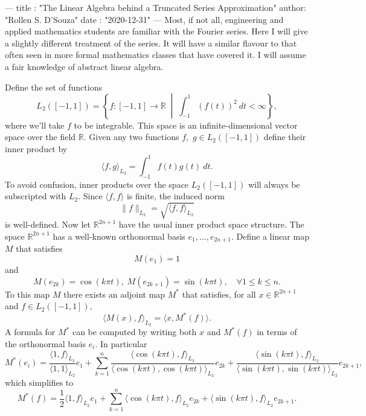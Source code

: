 ---
title :   "The Linear Algebra behind a Truncated Series Approximation"
author:   "Rollen S. D'Souza"
date  :   "2020-12-31"
---
Most, if not all, engineering and applied mathematics students are familiar with the Fourier series.
Here I will give a slightly different treatment of the series.
It will have a similar flavour to that often seen in more formal mathematics classes that have covered it.
I will assume a fair knowledge of abstract linear algebra.

Define the set of functions
\[
  L_2([-1, 1])
    =
      \left\{
        f: [-1, 1] \to \mathbb{R}
        \;\middle|\;
        \int_{-1}^{1} (f(t))^2 ~dt < \infty
      \right\},
\]
where we'll take \(f\) to be integrable.
This space is an infinite-dimensional vector space over the field \(\mathbb{R}.\)
Given any two functions \(f,\) \(g\in L_2([-1, 1])\) define their inner product by
\[
  \langle f, g \rangle_{L_2} = \int_{-1}^{1} f(t) g(t)~dt.
\]
To avoid confusion, inner products over the space \(L_2([-1, 1])\) will always be subscripted with \(L_2.\)
Since \(\langle f, f \rangle\) is finite, the induced norm
\[
  \|f\|_{L_2} = \sqrt{\langle f, f \rangle_{L_2}}
\]
is well-defined.
%
Now let \(\mathbb{R}^{2n+1}\) have the usual inner product space structure.
The space \(\mathbb{R}^{2n+1}\) has a well-known orthonormal basis \(e_1, \ldots, e_{2n+1}.\)
Define a linear map \(M\) that satisfies
\[
  M(e_1) = 1
\]
and
\[
  M(e_{2k}) = \cos(k \pi t),\; M(e_{2k+1}) = \sin(k \pi t),\quad \forall 1\leq k\leq n.
\]
To this map \(M\) there exists an adjoint map \(M^*\) that satisfies, for all \(x \in \mathbb{R}^{2n+1}\) and \(f \in L_2([-1, 1]),\)
\[
  \langle M(x), f \rangle_{L_2}
  =
  \langle x, M^*(f) \rangle.
\]
A formula for \(M^*\) can be computed by writing both \(x\) and \(M^*(f)\) in terms of the orthonormal basis \(e_i.\)
In particular
\[
  M^*(e_i)
    =
      \frac{\langle 1, f \rangle_{L_2}}{\langle 1, 1\rangle_{L_2}} e_1
      +
      \sum_{k = 1}^{n}
        \frac{\langle \cos(k \pi t), f \rangle_{L_2}}{\langle \cos(k \pi t), \cos(k \pi t)\rangle_{L_2}}
        e_{2k}
        +
        \frac{\langle \sin(k \pi t), f \rangle_{L_2}}{\langle \sin(k \pi t), \sin(k \pi t)\rangle_{L_2}}
        e_{2k+1},
\]
which simplifies to
\[
  M^*(f)
    =
      \frac{1}{2}\langle 1, f \rangle_{L_2} e_1
      +
      \sum_{k = 1}^{n}
        \langle \cos(k \pi t), f \rangle_{L_2}
        e_{2k}
        +
        \langle \sin(k \pi t), f \rangle_{L_2}
        e_{2k+1}.
\]

